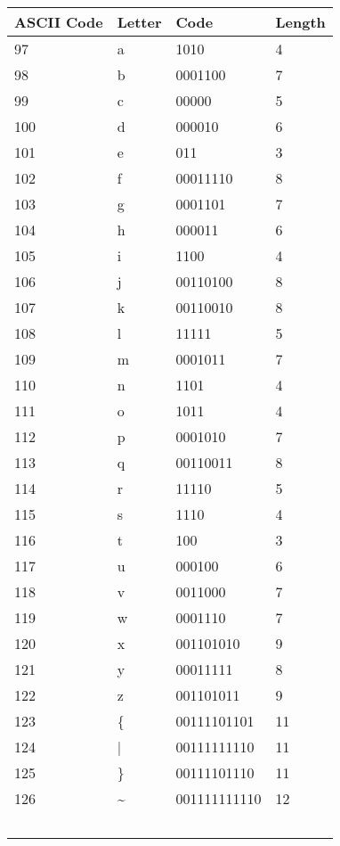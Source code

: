 \documentclass[]{article}
\begin{document}
\begin{center}
\begin{tabular}{ | l | l | l | l |} \hline
﻿\textbf{ASCII Code} & ﻿\textbf{Letter} & ﻿\textbf{Code} & ﻿\textbf{Length} \\ \hline
	97 & a & 1010 & 4 \\ \hline
	98 & b & 0001100 & 7 \\ \hline
	99 & c & 00000 & 5 \\ \hline
	100 & d & 000010 & 6 \\ \hline
	101 & e & 011 & 3 \\ \hline
	102 & f & 00011110 & 8 \\ \hline
	103 & g & 0001101 & 7 \\ \hline
	104 & h & 000011 & 6 \\ \hline
	105 & i & 1100 & 4 \\ \hline
	106 & j & 00110100 & 8 \\ \hline
	107 & k & 00110010 & 8 \\ \hline
	108 & l & 11111 & 5 \\ \hline
	109 & m & 0001011 & 7 \\ \hline
	110 & n & 1101 & 4 \\ \hline
	111 & o & 1011 & 4 \\ \hline
	112 & p & 0001010 & 7 \\ \hline
	113 & q & 00110011 & 8 \\ \hline
	114 & r & 11110 & 5 \\ \hline
	115 & s & 1110 & 4 \\ \hline
	116 & t & 100 & 3 \\ \hline
	117 & u & 000100 & 6 \\ \hline
	118 & v & 0011000 & 7 \\ \hline
	119 & w & 0001110 & 7 \\ \hline
	120 & x & 001101010 & 9 \\ \hline
	121 & y & 00011111 & 8 \\ \hline
	122 & z & 001101011 & 9 \\ \hline
	123 & \{ & 00111101101 & 11 \\ \hline
	124 & | & 00111111110 & 11 \\ \hline
	125 & \} & 00111101110 & 11 \\ \hline
	126 & \~{} & 001111111110 & 12 \\ \hline
	﻿\end{tabular}
\end{center}
\end{document}
